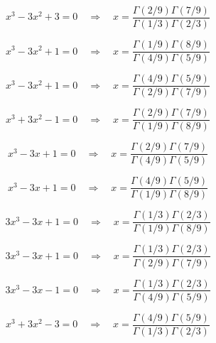 \documentclass[11pt,a4paper]{article}
\begin{document}
\begin{equation}\label{eq:48}
x^{3} - 3x^{2} + 3 = 0 \quad \Rightarrow \quad x = \frac{\Gamma(2/9)\Gamma(7/9)}{\Gamma(1/3)\Gamma(2/3)}
\end{equation}

\begin{equation}\label{eq:49}
x^{3} - 3x^{2} + 1 = 0 \quad \Rightarrow \quad x = \frac{\Gamma(1/9)\Gamma(8/9)}{\Gamma(4/9)\Gamma(5/9)}
\end{equation}

\begin{equation}\label{eq:50}
x^{3} - 3x^{2} + 1 = 0 \quad \Rightarrow \quad x = \frac{\Gamma(4/9)\Gamma(5/9)}{\Gamma(2/9)\Gamma(7/9)}
\end{equation}

\begin{equation}\label{eq:51}
x^{3} + 3x^{2} - 1 = 0 \quad \Rightarrow \quad x = \frac{\Gamma(2/9)\Gamma(7/9)}{\Gamma(1/9)\Gamma(8/9)}
\end{equation}

\begin{equation}\label{eq:52}
x^{3} - 3x + 1 = 0 \quad \Rightarrow \quad x = \frac{\Gamma(2/9)\Gamma(7/9)}{\Gamma(4/9)\Gamma(5/9)}
\end{equation}

\begin{equation}\label{eq:53}
x^{3} - 3x + 1 = 0 \quad \Rightarrow \quad x = \frac{\Gamma(4/9)\Gamma(5/9)}{\Gamma(1/9)\Gamma(8/9)}
\end{equation}

\begin{equation}\label{eq:54}
3x^{3} - 3x + 1 = 0 \quad \Rightarrow \quad x = \frac{\Gamma(1/3)\Gamma(2/3)}{\Gamma(1/9)\Gamma(8/9)}
\end{equation}

\begin{equation}\label{eq:55}
3x^{3} - 3x + 1 = 0 \quad \Rightarrow \quad x = \frac{\Gamma(1/3)\Gamma(2/3)}{\Gamma(2/9)\Gamma(7/9)}
\end{equation}

\begin{equation}\label{eq:56}
3x^{3} - 3x - 1 = 0 \quad \Rightarrow \quad x = \frac{\Gamma(1/3)\Gamma(2/3)}{\Gamma(4/9)\Gamma(5/9)}
\end{equation}

\begin{equation}\label{eq:57}
x^{3} + 3x^{2} - 3 = 0 \quad \Rightarrow \quad x = \frac{\Gamma(4/9)\Gamma(5/9)}{\Gamma(1/3)\Gamma(2/3)}
\end{equation}
\end{document}
